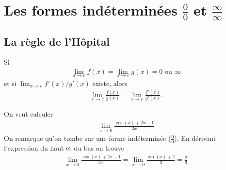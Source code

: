 \chapter{Les formes indéterminées $\frac{0}{0}$ et $\frac{\infty}{\infty}$}
\section{La règle de l'Hôpital}
\begin{myTheorem}
	Si\begin{eqnarray*}
		\lim_{x \to c}f(x)=\lim_{x \to c}g(x)=0\text{ ou }\infty 
	\end{eqnarray*}
	et si $\lim_{x\to c}f'(x)/g'(x)$ existe, alors
	\begin{eqnarray}
		\lim_{x\to c}\frac{f(x)}{g(x)} = \lim_{x\to c}\frac{f'(x)}{g'(x)}.
	\end{eqnarray}
\end{myTheorem}

\begin{myExample}
	On veut calculer
	\begin{eqnarray*}
		\lim_{x\rightarrow0}\frac{\cos{(x)}+2x-1}{3x}
	\end{eqnarray*}
	On remarque qu'on tombe sur une forme indéterminée ($\frac{0}{0}$). En dérivant l'expression du haut et du bas on trouve
	\begin{eqnarray}
		\lim_{x\rightarrow0}\frac{\cos{(x)}+2x-1}{3x}=\lim_{x\rightarrow0}\frac{\sin{(x)}+2}{3}=\frac{2}{3}
	\end{eqnarray}
\end{myExample}